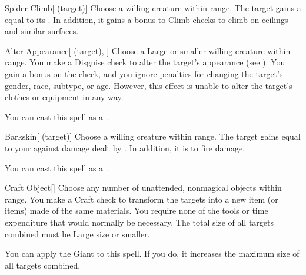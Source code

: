 \lowercase{\hypertarget{spell:Spider Climb}{}}\label{spell:Spider Climb}
\begin{ability}[\nth{1}]{\hypertarget{spell:Spider Climb}{Spider Climb}}[ (target)]
Choose a willing creature within \rngclose range.
The target gains a  equal to its .
In addition, it gains a  bonus to Climb checks to climb on ceilings and similar surfaces.
\end{ability}
\vspace{0.25em}



\lowercase{\hypertarget{spell:Alter Appearance}{}}\label{spell:Alter Appearance}
\begin{ability}[\nth{2}]{\hypertarget{spell:Alter Appearance}{Alter Appearance}}[ (target), ]
Choose a Large or smaller willing creature within \rngclose range.
You make a Disguise check to alter the target's appearance (see ).
You gain a  bonus on the check, and you ignore penalties for changing the target's gender, race, subtype, or age.
However, this effect is unable to alter the target's clothes or equipment in any way.

You can cast this spell as a .
\end{ability}
\vspace{0.25em}



\lowercase{\hypertarget{spell:Barkskin}{}}\label{spell:Barkskin}
\begin{ability}[\nth{2}]{\hypertarget{spell:Barkskin}{Barkskin}}[ (target)]
Choose a willing creature within \rngclose range.
The target gains  equal to your  against damage dealt by .
In addition, it is  to fire damage.

You can cast this spell as a .
\end{ability}
\vspace{0.25em}



\lowercase{\hypertarget{spell:Craft Object}{}}\label{spell:Craft Object}
\begin{ability}[\nth{3}]{\hypertarget{spell:Craft Object}{Craft Object}}[]
Choose any number of unattended, nonmagical objects within \rngclose range.
You make a Craft check to transform the targets into a new item (or items) made of the same materials.
You require none of the tools or time expenditure that would normally be necessary.
The total size of all targets combined must be Large size or smaller.

You can apply the Giant  to this spell.
If you do, it increases the maximum size of all targets combined.
\end{ability}
\vspace{0.25em}



